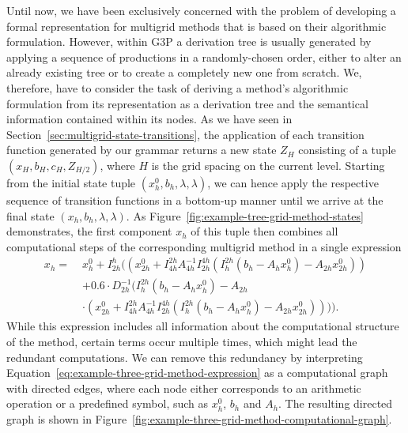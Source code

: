 Until now, we have been exclusively concerned with the problem of developing a formal representation for multigrid methods that is based on their algorithmic formulation.
However, within G3P a derivation tree is usually generated by applying a sequence of productions in a randomly-chosen order, either to alter an already existing tree or to create a completely new one from scratch.
We, therefore, have to consider the task of deriving a method's algorithmic formulation from its representation as a derivation tree and the semantical information contained within its nodes.
As we have seen in Section~\ref{sec:multigrid-state-transitions}, the application of each transition function generated by our grammar returns a new state $Z_H$ consisting of a tuple $\left( x_{H}, b_{H}, c_{H}, Z_{H/2}\right)$, where $H$ is the grid spacing on the current level.
Starting from the initial state tuple $\left(x_{h}^0, b_{h}, \lambda, \lambda\right)$, we can hence apply the respective sequence of transition functions in a bottom-up manner until we arrive at the final state $\left(x_{h}, b_{h}, \lambda, \lambda\right)$.
As Figure~\ref{fig:example-tree-grid-method-states} demonstrates, the first component $x_{h}$ of this tuple then combines all computational steps of the corresponding multigrid method in a single expression
\begin{equation}\tag{4.7}
	\begin{split}
		x_h = \; & x_{h}^0 + I_{2h}^h ((x_{2h}^0 + I_{4h}^{2h} A_{4h}^{-1} I_{2h}^{4h} (I_{h}^{2h}(b_{h} - A_h x_{h}^0) - A_{2h} x_{2h}^0)) \\
		& + 0.6 \cdot D_{2h}^{-1} (I_{h}^{2h}(b_{h} - A_h x_{h}^0) - A_{2h} \\
		& \cdot (x_{2h}^0 + I_{4h}^{2h} A_{4h}^{-1} I_{2h}^{4h} (I_{h}^{2h}(b_{h} - A_h x_{h}^0) - A_{2h} x_{2h}^0)))).
		\label{eq:example-three-grid-method-expression}
	\end{split}
\end{equation}
While this expression includes all information about the computational structure of the method, certain terms occur multiple times, which might lead the redundant computations.
We can remove this redundancy by interpreting Equation~\eqref{eq:example-three-grid-method-expression} as a computational graph with directed edges, where each node either corresponds to an arithmetic operation or a predefined symbol, such as $x^0_h$, $b_h$ and $A_h$.
The resulting directed graph is shown in Figure~\ref{fig:example-three-grid-method-computational-graph}.
